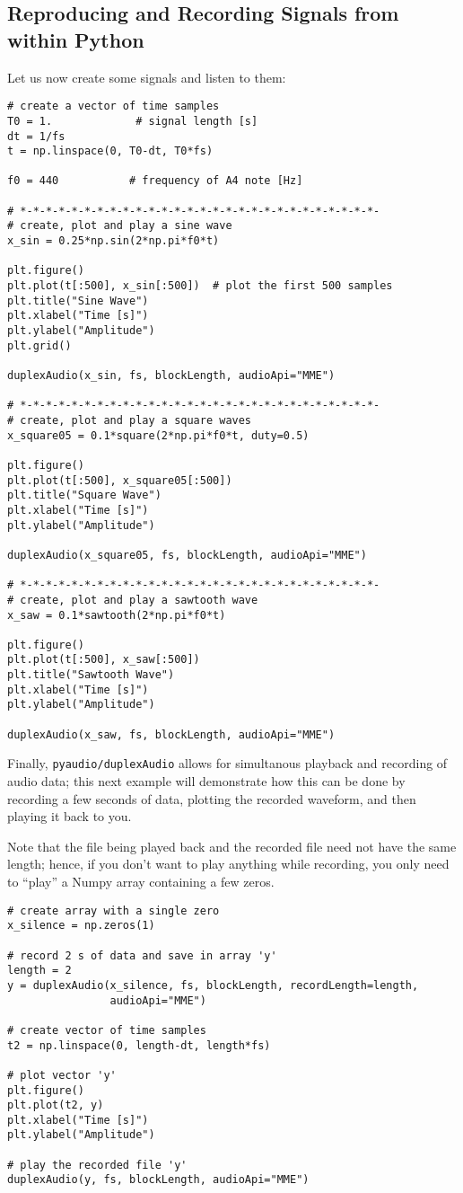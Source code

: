 \subsection{Reproducing and Recording Signals from within Python}

Let us now create some signals and listen to them:
\begin{lstlisting}[frame=single]
# create a vector of time samples
T0 = 1.             # signal length [s]
dt = 1/fs
t = np.linspace(0, T0-dt, T0*fs)

f0 = 440           # frequency of A4 note [Hz]

# *-*-*-*-*-*-*-*-*-*-*-*-*-*-*-*-*-*-*-*-*-*-*-*-*-*-*-*-
# create, plot and play a sine wave
x_sin = 0.25*np.sin(2*np.pi*f0*t)

plt.figure()
plt.plot(t[:500], x_sin[:500])  # plot the first 500 samples
plt.title("Sine Wave")
plt.xlabel("Time [s]")
plt.ylabel("Amplitude")
plt.grid()

duplexAudio(x_sin, fs, blockLength, audioApi="MME")

# *-*-*-*-*-*-*-*-*-*-*-*-*-*-*-*-*-*-*-*-*-*-*-*-*-*-*-*-
# create, plot and play a square waves
x_square05 = 0.1*square(2*np.pi*f0*t, duty=0.5)

plt.figure()
plt.plot(t[:500], x_square05[:500])
plt.title("Square Wave")
plt.xlabel("Time [s]")
plt.ylabel("Amplitude")

duplexAudio(x_square05, fs, blockLength, audioApi="MME")

# *-*-*-*-*-*-*-*-*-*-*-*-*-*-*-*-*-*-*-*-*-*-*-*-*-*-*-*-
# create, plot and play a sawtooth wave
x_saw = 0.1*sawtooth(2*np.pi*f0*t)

plt.figure()
plt.plot(t[:500], x_saw[:500])
plt.title("Sawtooth Wave")
plt.xlabel("Time [s]")
plt.ylabel("Amplitude")

duplexAudio(x_saw, fs, blockLength, audioApi="MME")
\end{lstlisting}

Finally, {\tt pyaudio/duplexAudio} allows for simultanous playback and recording of audio data; this next example will demonstrate how this can be done by recording a few seconds of data, plotting the recorded waveform, and then playing it back to you.

Note that the file being played back and the recorded file need not have the same length; hence, if you don't want to play anything while recording, you only need to ``play'' a Numpy array containing a few zeros.

\begin{lstlisting}[frame=single]
# create array with a single zero
x_silence = np.zeros(1)

# record 2 s of data and save in array 'y'
length = 2
y = duplexAudio(x_silence, fs, blockLength, recordLength=length,
                audioApi="MME")

# create vector of time samples
t2 = np.linspace(0, length-dt, length*fs)

# plot vector 'y'
plt.figure()
plt.plot(t2, y)
plt.xlabel("Time [s]")
plt.ylabel("Amplitude")

# play the recorded file 'y'
duplexAudio(y, fs, blockLength, audioApi="MME")
\end{lstlisting}

